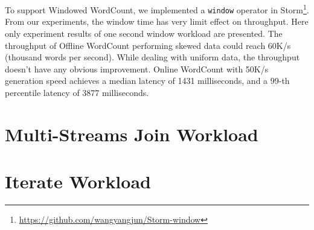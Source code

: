 To support Windowed WordCount, we implemented a \texttt{window} operator in Storm\footnote{\url{https://github.com/wangyangjun/Storm-window}}. From our experiments, the window time has very limit effect on throughput. Here only experiment results of one second window workload are presented. The throughput of Offline WordCount performing skewed data could reach 60K/s (thousand words per second). While dealing with uniform data, the throughput doesn't have any obvious improvement. Online WordCount with 50K/s generation speed achieves a median latency of 1431 milliseconds, and a 99-th percentile latency of 3877 milliseconds.


\section{Multi-Streams Join Workload}

\section{Iterate Workload}


\clearpage